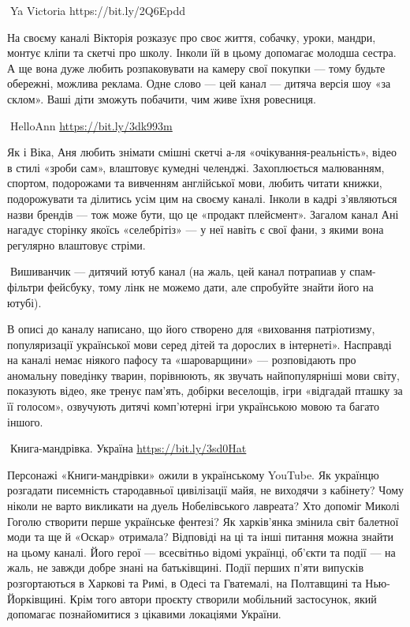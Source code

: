 🦉Ya Victoria https://bit.ly/2Q6Epdd

На своєму каналі Вікторія розказує про своє життя, собачку, уроки, мандри,
монтує кліпи та скетчі про школу. Інколи їй в цьому допомагає молодша сестра. А
ще вона дуже любить розпаковувати на камеру свої покупки — тому будьте
обережні, можлива реклама. Одне слово — цей канал — дитяча версія шоу «за
склом». Ваші діти зможуть побачити, чим живе їхня ровесниця.

🦉HelloAnn \url{https://bit.ly/3dk993m} 

Як і Віка, Аня любить знімати смішні скетчі а-ля «очікування-реальність», відео
в стилі «зроби сам», влаштовує кумедні челенджі. Захоплюється малюванням,
спортом, подорожами та вивченням англійської мови, любить читати книжки,
подорожувати та ділитись усім цим на своєму каналі. Інколи в кадрі з’являються
назви брендів — тож може бути, що це «продакт плейсмент». Загалом канал Ані
нагадує сторінку якоїсь «селебрітіз» — у неї навіть є свої фани, з якими вона
регулярно влаштовує стріми.

🦉Вишиванчик — дитячий ютуб канал (на жаль, цей канал потрапиав у спам-фільтри
фейсбуку, тому лінк не можемо дати, але спробуйте знайти його на ютубі).

В описі до каналу написано, що його створено для «виховання патріотизму,
популяризації української мови серед дітей та дорослих в інтернеті». Насправді
на каналі немає ніякого пафосу та «шароварщини» — розповідають про аномальну
поведінку тварин, порівнюють, як звучать найпопулярніші мови світу, показують
відео, яке тренує пам’ять, добірки веселощів, ігри «відгадай пташку за її
голосом», озвучують дитячі комп’ютерні ігри українською мовою та багато іншого.

🦉Книга-мандрівка. Україна \url{https://bit.ly/3sd0Hat}

Персонажі «Книги-мандрівки» ожили в українському YouTube. Як українцю розгадати
писемність стародавньої цивілізації майя, не виходячи з кабінету? Чому ніколи
не варто викликати на дуель Нобелівського лавреата? Хто допоміг Миколі Гоголю
створити перше українське фентезі? Як харків’янка змінила світ балетної моди та
ще й «Оскар» отримала? Відповіді на ці та інші питання можна знайти на цьому
каналі. Його герої — всесвітньо відомі українці, об’єкти та події — на жаль, не
завжди добре знані на батьківщині. Події перших п’яти випусків розгортаються в
Харкові та Римі, в Одесі та Гватемалі, на Полтавщині та Нью-Йорківщині. Крім
того автори проєкту створили мобільний застосунок, який допомагає познайомитися
з цікавими локаціями України.


